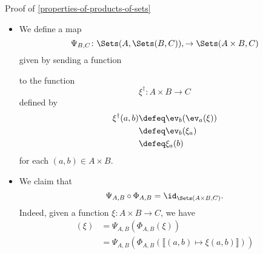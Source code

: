 \begin{Proof}{Proof of \cref{properties-of-products-of-sets}}
\begin{itemize}
            \[
                \xi^{\dagger}%
                \defeq%
                \llbracket a\mapsto\llbracket b\mapsto\xi(a,b)\rrbracket\rrbracket.%
            \]%
        \item\label{proof-of-properties-of-products-of-sets-adjointness-1-2}We define a map
            \[
                \Psi_{B,C}%
                \colon%
                \Sets(A,\Sets(B,C)),%
                \to%
                \Sets(A\times B,C)%
            \]%
            given by sending a function
            \begin{webcompile}
                \phantom{\xi\colon}
            \end{webcompile}
            to the function
            \[
                \xi^{\dagger}%
                \colon%
                A\times B%
                \to
                C
            \]%
            defined by
            \begin{align*}
                \xi^{\dagger}(a,b) &\defeq \ev_{b}(\ev_{a}(\xi))\\%
                                   &\defeq \ev_{b}(\xi_{a})\\%
                                   &\defeq \xi_{a}(b)%
            \end{align*}
            for each $(a,b)\in A\times B$.
        \item\label{proof-of-properties-of-products-of-sets-adjointness-1-3}We claim that
            \[
                \Psi_{A,B}\circ\Phi_{A,B}%
                =%
                \id_{\Sets(A\times B,C)}.%
            \]%
            Indeed, given a function $\xi\colon A\times B\to C$, we have
            \begin{align*}
                [\Psi_{A,B}\circ\Phi_{A,B}](\xi) &= \Psi_{A,B}(\Phi_{A,B}(\xi))\\%
                                                 &= \Psi_{A,B}(\Phi_{A,B}(\llbracket(a,b)\mapsto\xi(a,b)\rrbracket))\\%

\end{align*}
\end{itemize}
\end{Proof}
